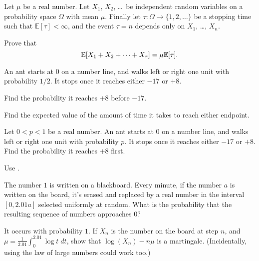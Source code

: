 \begin{problem}
	Let $\mu$ be a real number.
	Let $X_1$, $X_2$, \dots\ be independent random variables
	on a probability space $\Omega$ with mean $\mu$.
	Finally let $\tau \colon \Omega \to \{1, 2, \dots\}$
	be a stopping time such that $\mathbb E[\tau] < \infty$,
	and the event $\tau = n$ depends only on $X_1$, \dots, $X_n$.

	Prove that
	\[ \mathbb E[X_1 + X_2 + \dots + X_\tau] = \mu \mathbb E[\tau]. \]
\end{problem}

\begin{problem}
	An ant starts at $0$ on a number line,
	and walks left or right one unit with probability $1/2$.
	It stops once it reaches either $-17$ or $+8$.
	\begin{enumerate}[(a)]
		\ii Find the probability it reaches $+8$ before $-17$.

		\ii Find the expected value of the amount of time
		it takes to reach either endpoint.
	\end{enumerate}
\end{problem}

\begin{problem}
	Let $0 < p < 1$ be a real number.
	An ant starts at $0$ on a number line,
	and walks left or right one unit with probability $p$.
	It stops once it reaches either $-17$ or $+8$.
	Find the probability it reaches $+8$ first.
	\begin{hint}
		Use .
	\end{hint}
\end{problem}

\begin{problem}
	The number $1$ is written on a blackboard.
	Every minute, if the number $a$ is written on the board,
	it's erased and replaced by a real number
	in the interval $[0, 2.01a]$ selected uniformly at random.
	What is the probability that the resulting sequence of numbers approaches $0$?
	\begin{hint}
		It occurs with probability $1$.
		If $X_n$ is the number on the board at step $n$,
		and $\mu = \frac{1}{2.01} \int_0^{2.01} \log t \; dt$,
		show that $\log(X_n) - n \mu$ is a martingale.
		(Incidentally, using the law of large numbers could work too.)
	\end{hint}
\end{problem}
